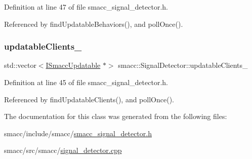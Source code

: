 Definition at line 47 of file smacc\+\_\+signal\+\_\+detector.\+h.



Referenced by find\+Updatable\+Behaviors(), and poll\+Once().

\mbox{\label{classsmacc_1_1SignalDetector_a01a457b4ec935473d6426efb7b87e683}} 
\subsubsection{\texorpdfstring{updatable\+Clients\+\_\+}{updatableClients\_}}
{\footnotesize\ttfamily std\+::vector$<$\hyperlink{classsmacc_1_1ISmaccUpdatable}{I\+Smacc\+Updatable} $\ast$$>$ smacc\+::\+Signal\+Detector\+::updatable\+Clients\+\_\+\hspace{0.3cm}{\ttfamily [private]}}



Definition at line 45 of file smacc\+\_\+signal\+\_\+detector.\+h.



Referenced by find\+Updatable\+Clients(), and poll\+Once().



The documentation for this class was generated from the following files\+:\begin{DoxyCompactItemize}
\item 
smacc/include/smacc/\hyperlink{smacc__signal__detector_8h}{smacc\+\_\+signal\+\_\+detector.\+h}\item 
smacc/src/smacc/\hyperlink{signal__detector_8cpp}{signal\+\_\+detector.\+cpp}\end{DoxyCompactItemize}
